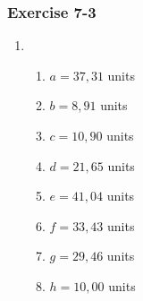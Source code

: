 {\begin{multicols}{3}
\begin{enumerate}[noitemsep, label=\textbf{\arabic*}. ]
% 
\end{enumerate}
\subsubsection*{Exercise 7-3} %
\begin{enumerate}[noitemsep, label=\textbf{\arabic*}. ]
\item %
      \begin{enumerate}[noitemsep, label=\textbf{(\alph*)} ]
      
\item $a=37,31$ units
\item $b=8,91$ units
\item $c=10,90$ units
\item $d=21,65$ units
\item $e=41,04$ units
\item $f=33,43$ units
\item $g=29,46$ units
\item $h=10,00$ units
      \end{enumerate}



\end{enumerate}
\end{multicols}}
